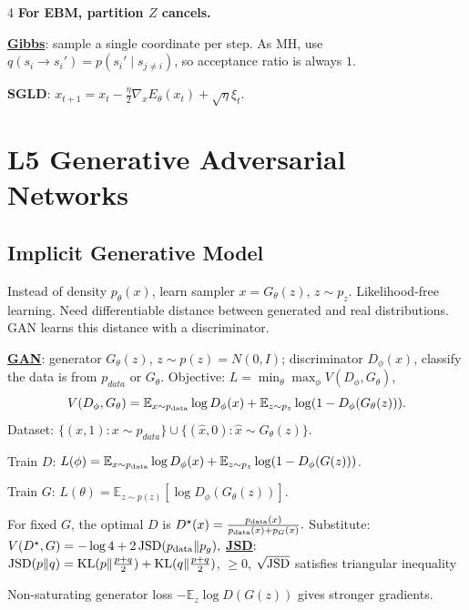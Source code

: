 \documentclass{article}
\newcommand{\key}[1]{\textbf{#1}}
\newcommand{\lowterm}[1]{\textbf{\underline{#1}}}
\newcommand{\E}{\mathbb{E}}
\newcommand{\1}{\mathbf 1}
\begin{document}
\begin{multicols*}{4}
\key{For EBM, partition $Z$ cancels. }

\lowterm{Gibbs}: sample a single coordinate per step. As MH, use $q(s_i\to s_i')=p(s_i'\mid s_{j\ne i})$, so acceptance ratio is always $1$. 

\key{SGLD}: $x_{t+1}=x_t-\frac{\eta}{2}\nabla_xE_\theta(x_t)+\sqrt{\eta}\xi_t$.

\section{L5 Generative Adversarial Networks}
\subsection{Implicit Generative Model}
Instead of density $p_\theta(x)$, learn sampler $x=G_\theta(z)$, $z\sim p_z$. Likelihood-free learning. Need differentiable distance between generated and real distributions. GAN learns this distance with a discriminator.

\lowterm{GAN}: generator $G_\theta(z)$, $z\sim p(z)=N(0,I)$; discriminator $D_\phi(x)$, classify the data is from $p_{data}$ or $G_\theta$. Objective: $L=\min_\theta\max_\phi V(D_\phi,G_\theta)$, 
\[
V(D_\phi,G_\theta)=\E_{x\sim p_{\rm data}}\log D_\phi(x)+\E_{z\sim p_z}\log(1-D_\phi(G_\theta(z))).
\]
Dataset: $\{(x,1):x\sim p_{data}\}\cup\{(\hat{x},0):\hat{x}\sim G_\theta(z)\}$.

Train $D$: $L(\phi)=\E_{x\sim p_{\rm data}}\log D_\phi(x)+\E_{z\sim p_z}\log(1-D_\phi(G(z)))$. 

Train $G$: $L(\theta)=\E_{z\sim p(z)}[\log D_\phi(G_\theta(z))]$.

For fixed $G$, the optimal $D$ is 
\(
D^\star(x)=\frac{p_{\rm data}(x)}{p_{\rm data}(x)+p_G(x)}.
\) 
Substitute:
\(
V(D^\star,G)=-\log4+2\,{\rm JSD}(p_{\rm data}\|p_g), 
\)
\lowterm{JSD}: ${\rm JSD}(p\|q)={\rm KL}(p\|\frac{p+q}{2})+{\rm KL}(q\|\frac{p+q}{2})$, $\geq 0$, $\sqrt{\rm JSD}$ satisfies triangular inequality

Non-saturating generator loss $-\E_z\log D(G(z))$ gives stronger gradients.


\end{multicols*}
\end{document}
